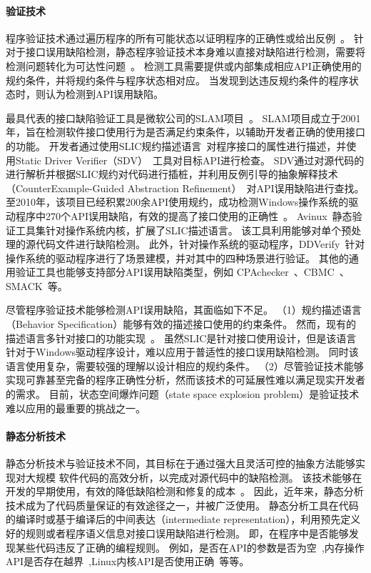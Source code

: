 \paragraph{验证技术}
程序验证技术通过遍历程序的所有可能状态以证明程序的正确性或给出反例~\cite{08-tcad-sv}。
针对于接口误用缺陷检测，静态程序验证技术本身难以直接对缺陷进行检测，需要将检测问题转化为可达性问题~\cite{rp}。
检测工具需要提供或内部集成相应API正确使用的规约条件，并将规约条件与程序状态相对应。
当发现到达违反规约条件的程序状态时，则认为检测到API误用缺陷。

最具代表的接口缺陷验证工具是微软公司的SLAM项目~\cite{slam}。
SLAM项目成立于2001年，旨在检测软件接口使用行为是否满足约束条件，以辅助开发者正确的使用接口的功能。
开发者通过使用SLIC规约描述语言~\cite{01-slic}对程序接口的属性进行描述，并使用Static Driver Verifier（SDV）~\cite{02-acm-slam}工具对目标API进行检查。
SDV通过对源代码的进行解析并根据SLIC规约对代码进行插桩，并利用反例引导的抽象解释技术（CounterExample-Guided Abstraction Refinement）~\cite{00-cav-counter,02-acm-abs}对API误用缺陷进行查找。
至2010年，该项目已经积累200余API使用规约，成功检测Windows操作系统的驱动程序中270个API误用缺陷，有效的提高了接口使用的正确性~\cite{10-cad-slam, 11-acm-slam}。
Avinux~\cite{09-avinux}静态验证工具集针对操作系统内核，扩展了SLIC描述语言。
该工具利用能够对单个预处理的源代码文件进行缺陷检测。
此外，针对操作系统的驱动程序，DDVerify~\cite{07-ase-ddverify}针对操作系统的驱动程序进行了场景建模，并对其中的四种场景进行验证。
其他的通用验证工具也能够支持部分API误用缺陷类型，例如
CPAchecker~\cite{07-cav-cpachecker}、CBMC~\cite{14-tacas-cbmc}、SMACK~\cite{14-cav-smack}等。


尽管程序验证技术能够检测API误用缺陷，其面临如下不足。
（1）规约描述语言（Behavior Specification）能够有效的描述接口使用的约束条件。
然而，现有的描述语言多针对接口的功能实现~\cite{blast, acsl}。
虽然SLIC是针对接口使用设计，但是该语言针对于Windows驱动程序设计，难以应用于普适性的接口误用缺陷检测。
同时该语言使用复杂，需要较强的理解以设计相应的规约条件。
（2）尽管验证技术能够实现可靠甚至完备的程序正确性分析，然而该技术的可延展性难以满足现实开发者的需求。
目前，状态空间爆炸问题（state space explosion problem）是验证技术难以应用的最重要的挑战之一。

\paragraph{静态分析技术}
静态分析技术与验证技术不同，其目标在于通过强大且灵活可控的抽象方法能够实现对大规模
软件代码的高效分析，以完成对源代码中的缺陷检测。
该技术能够在开发的早期使用，有效的降低缺陷检测和修复的成本~\cite{06-cost}。
因此，近年来，静态分析技术成为了代码质量保证的有效途径之一，并被广泛使用。
静态分析工具在代码的编译时或基于编译后的中间表达（intermediate representation），利用预先定义好的规则或者程序语义信息对接口误用缺陷进行检测。
即，在程序中是否能够发现某些代码违反了正确的编程规则。
例如，是否在API的参数是否为空~\cite{00-osdi-npd},内存操作API是否存在越界~\cite{11-ras-overflow},Linux内核API是否使用正确~\cite{09-dsn-linux}等等。

